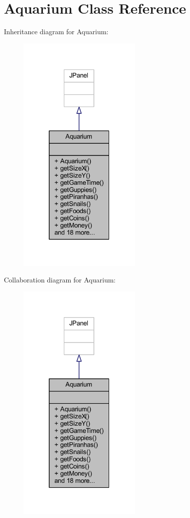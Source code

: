 \hypertarget{class_aquarium}{}\section{Aquarium Class Reference}
\label{class_aquarium}


Inheritance diagram for Aquarium\+:
\nopagebreak
\begin{figure}[H]
\begin{center}
\leavevmode
\includegraphics[width=172pt]{class_aquarium__inherit__graph}
\end{center}
\end{figure}


Collaboration diagram for Aquarium\+:
\nopagebreak
\begin{figure}[H]
\begin{center}
\leavevmode
\includegraphics[width=172pt]{class_aquarium__coll__graph}
\end{center}
\end{figure}

